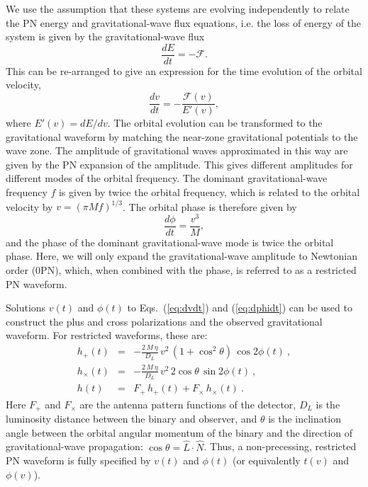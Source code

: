 We use the assumption that these systems are evolving independently to relate
the \ac{PN} energy and gravitational-wave flux equations, i.e. the loss of energy of the
system is given by the gravitational-wave flux
%
\begin{equation}
%
\frac{dE}{dt} = - \mathcal{F}.
%
\end{equation}
%
This can be re-arranged to give an expression for the time evolution of the
orbital velocity,
%
\begin{equation}\label{eq:dvdt}
%
\frac{d v}{dt} = - \frac{\mathcal{F}(v)}{E'(v)},
%
\end{equation}
%
where $E'(v) = dE/dv$. The orbital evolution can be transformed to the gravitational
waveform by matching the near-zone gravitational potentials to the wave
zone. The amplitude of gravitational waves approximated in this way are given by the
\ac{PN} expansion of the amplitude. This gives different amplitudes for
different modes of the orbital frequency. The dominant gravitational-wave frequency $f$ is
given by twice the orbital frequency, which is related to the orbital velocity
by $v = (\pi M f)^{1/3}$. The orbital phase is therefore given by 
%
\begin{equation}\label{eq:dphidt}
%
\frac{d\phi}{dt} = \frac{v^3}{M},
%
\end{equation}
%
and the phase of the dominant gravitational-wave mode is twice the orbital phase.
Here, we will only expand the  gravitational-wave  amplitude to Newtonian
order (0\ac{PN}), which, when combined with the phase, is referred to as a
restricted \ac{PN} waveform.

Solutions $v(t)$ and $\phi(t)$ to Eqs.~(\ref{eq:dvdt}) and (\ref{eq:dphidt})
can be used to construct the plus and cross polarizations and the observed
gravitational waveform.  For restricted waveforms, these are:
%
\begin{eqnarray}
%
h_+(t) &=& - \frac{2\,M\,\eta}{D_L}\,v^2\,(1 + \cos^2 \theta)\,\cos 2 \phi(t)\
, \\
%
h_\times(t) &=& - \frac{2\,M\,\eta}{D_L}\,v^2\,2 \cos \theta\,\sin 2 \phi(t)\ ,
\\
%
h(t) &=& F_+ \, h_+(t) + F_\times \, h_\times(t)\ .
%
\end{eqnarray}
%
Here $F_+$ and $F_\times$ are the antenna pattern functions of the detector,
$D_L$ is the luminosity distance between the binary and observer, and $\theta$
is the inclination angle between the orbital angular momentum of the binary and
the direction of gravitational-wave propagation: $\cos \theta = \hat{L} \cdot \hat{N}$. Thus, a
non-precessing, restricted PN waveform is fully specified by 
$v(t)$ and $\phi(t)$ (or equivalently $t(v)$ and $\phi(v)$).

